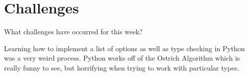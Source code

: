 \section{Challenges}

What challenges have occurred for this week?

Learning how to implement a list of options as well as type checking in Python was a very weird process. 
Python works off of the Ostrich Algorithm which is really funny to see, but horrifying when trying to work with particular types.
